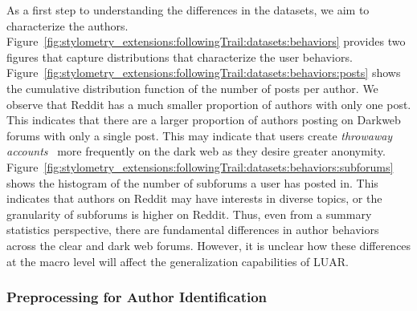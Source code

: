 As a first step to understanding the differences in the datasets, we aim to characterize the authors.
Figure~\ref{fig:stylometry_extensions:followingTrail:datasets:behaviors} provides two figures that capture distributions that characterize the user behaviors.
Figure~\ref{fig:stylometry_extensions:followingTrail:datasets:behaviors:posts} shows the cumulative distribution function of the number of posts per author.
We observe that Reddit has a much smaller proportion of authors with only one post.
This indicates that there are a larger proportion of authors posting on Darkweb forums with only a single post.
This may indicate that users create \textit{throwaway accounts}~\cite{leavitt2015throwaway} more frequently on the dark web as they desire greater anonymity.
Figure~\ref{fig:stylometry_extensions:followingTrail:datasets:behaviors:subforums} shows the histogram of the number of subforums a user has posted in.
This indicates that authors on Reddit may have interests in diverse topics, or the granularity of subforums is higher on Reddit.
Thus, even from a summary statistics perspective, there are fundamental differences in author behaviors across the clear and dark web forums.
However, it is unclear how these differences at the macro level will affect the generalization capabilities of LUAR.

\subsubsection{Preprocessing for Author Identification}
